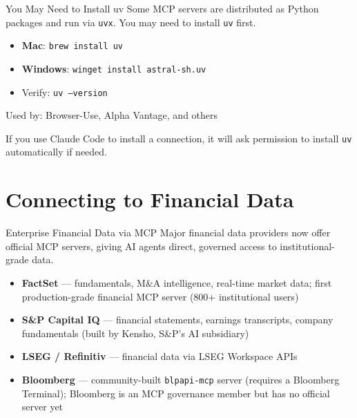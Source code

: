 \documentclass[aspectratio=169]{beamer}
\begin{document}
\begin{frame}[fragile]{You May Need to Install uv}
Some MCP servers are distributed as Python packages and run via \texttt{uvx}.  You may need to install \texttt{uv} first.
\vspace{0.3cm}
\begin{shadedbox}[title=\textbf{Manual install}]
\begin{itemize}\small
  \item \textbf{Mac}: \texttt{brew install uv}
  \item \textbf{Windows}: \texttt{winget install astral-sh.uv}
  \item Verify: \texttt{uv --version}
\end{itemize}
\vspace{0.1cm}
{\scriptsize Used by: Browser-Use, Alpha Vantage, and others}
\end{shadedbox}
\vspace{0.3cm}
If you use Claude Code to install a connection, it will ask permission to install \texttt{uv} automatically if needed.
\end{frame}

\section{Connecting to Financial Data}

\begin{frame}{Enterprise Financial Data via MCP}
Major financial data providers now offer official MCP servers, giving AI agents direct, governed access to institutional-grade data.
\vspace{0.3cm}
\begin{itemize}
  \item \textbf{FactSet} --- fundamentals, M\&A intelligence, real-time market data; first production-grade financial MCP server (800+ institutional users)
  \item \textbf{S\&P Capital IQ} --- financial statements, earnings transcripts, company fundamentals (built by Kensho, S\&P's AI subsidiary)
  \item \textbf{LSEG / Refinitiv} --- financial data via LSEG Workspace APIs
  \item \textbf{Bloomberg} --- community-built \texttt{blpapi-mcp} server (requires a Bloomberg Terminal); Bloomberg is an MCP governance member but has no official server yet
\end{itemize}
\end{frame}
\end{document}

